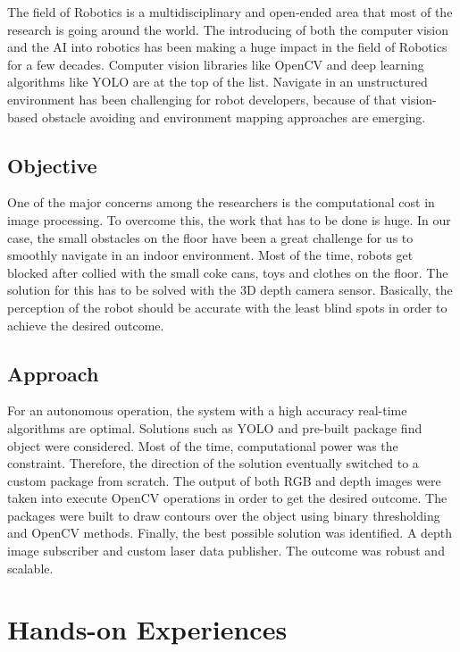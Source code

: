 \documentclass[twoside,12pt,times,onecolumn,a4paper]{report}
\begin{document}
The field of Robotics is a multidisciplinary and open-ended area that most of the research is going around the world. The introducing of both the computer vision and the AI into robotics has been making a huge impact in the field of Robotics for a few decades. Computer vision libraries like OpenCV and deep learning algorithms like YOLO are at the top of the list. Navigate in an unstructured environment has been challenging for robot developers, because of that vision-based obstacle avoiding and environment mapping approaches are emerging. 

\section{Objective}

One of the major concerns among the researchers is the computational cost in image processing. To overcome this, the work that has to be done is huge. In our case, the small obstacles on the floor have been a great challenge for us to smoothly navigate in an indoor environment. Most of the time, robots get blocked after collied with the small coke cans, toys and clothes on the floor. The solution for this has to be solved with the 3D depth camera sensor. Basically, the perception of the robot should be accurate with the least blind spots in order to achieve the desired outcome. 

\section{Approach}

For an autonomous operation, the system with a high accuracy real-time algorithms are optimal. Solutions such as YOLO and pre-built package find object were considered. Most of the time, computational power was the 
constraint. Therefore, the direction of the solution eventually switched to a custom 
package from scratch. The output of both RGB and depth images were taken into 
execute OpenCV operations in order to get the desired outcome. The packages 
were built to draw contours over the object using binary thresholding and OpenCV 
methods. Finally, the best possible solution was identified. A depth image 
subscriber and custom laser data publisher. The outcome was robust and scalable.

\chapter{Hands-on Experiences}
\end{document}
